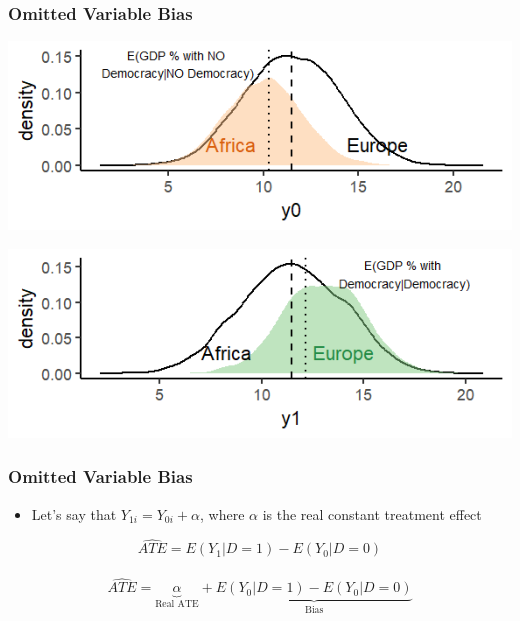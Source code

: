 \documentclass[xcolor=x11names,compress]{beamer}\usepackage[]{graphicx}\usepackage[]{color}
\makeatletter
\def\maxwidth{ %
  \ifdim\Gin@nat@width>\linewidth
    \linewidth
  \else
    \Gin@nat@width
  \fi
}
\newenvironment{knitrout}{}{} %
\renewcommand{\(}{\begin{columns}}
\renewcommand{\)}{\end{columns}}
\newcommand{\<}[1]{\begin{column}{#1}}
\renewcommand{\>}{\end{column}}
\makeatother
\begin{document}
\begin{frame}
\frametitle{Omitted Variable Bias}
\begin{knitrout}
\color{fgcolor}
\includegraphics[width=\maxwidth]{figure/OVB3-1} 

\end{knitrout}

\begin{knitrout}
\color{fgcolor}
\includegraphics[width=\maxwidth]{figure/OVB4-1} 

\end{knitrout}
\end{frame}

\begin{frame}
\frametitle{Omitted Variable Bias}
\begin{itemize}
\item Let's say that $Y_{1i} = Y_{0i} + \alpha$, where $\alpha$ is the real constant treatment effect
\end{itemize}
$$ \hat{ATE} = E(Y_1|D=1) - E(Y_0|D=0)$$ \\ \pause
$$ \hat{ATE} = \underbrace{\alpha}_\text{Real ATE} + \underbrace{E(Y_0|D=1) - E(Y_0|D=0)}_\text{Bias}$$ \\ \pause
\end{frame}
\end{document}
